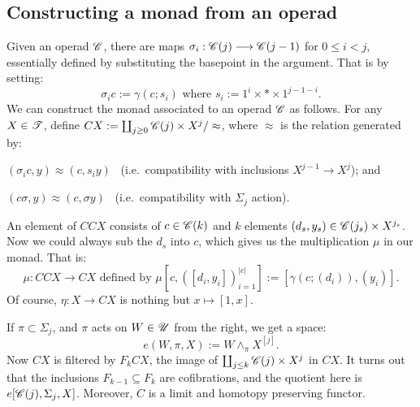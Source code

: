 \documentclass[11pt]{article}
\begin{document}
\subsection{Constructing a monad from an operad}
Given an operad $\mathscr{C}$, there are maps $\sigma_i:\mathscr{C}(j)\longrightarrow\mathscr{C}(j-1)$ for
$0\leq i<j$, essentially defined by substituting the basepoint in the \iTH
argument. That is by setting:
\[\sigma_ic:=\gamma(c;s_i)\text{ where }s_i:=1^i\times *\times1^{j-1-i}.\]
We can construct the monad associated to an operad $\mathscr{C}$ as follows. For any
$X\in\mathscr{T}$, define $CX:=\coprod_{j\geq0}\mathscr{C}(j)\times X^j/\approx$, where
$\approx$ is the relation generated by:
\begin{itemise}
\item $(\sigma_ic,y)\approx (c,s_iy)$ \ (i.e.\ 
compatibility with inclusions $X^{j-1}\to X^j$); and
\item $(c\sigma,y)\approx (c,\sigma y)$ \ (i.e.\ 
compatibility with $\Sigma_j$ action).
\end{itemise}
An element of $CCX$ consists of $c\in \mathscr{C}(k)$ and $k$ elements 
$(d_s,y_s)\in \mathscr{C}(j_s)\times X^{j_s}$. Now we could always sub the $d_s$
into $c$, which gives us the multiplication $\mu$ in our monad. That is:
\[\mu:CCX\to CX\text{ defined by }
\mu[c,([d_i,y_i])_{i=1}^{|c|}]:=[\gamma(c;(d_i)),(y_i)].\]
Of course, $\eta:X\to CX$ is nothing but $x\mapsto [1,x]$.

If $\pi\subset\Sigma_j$, 
and $\pi$ acts on $W\in\mathscr{U}$ from the right, we get a space:
\[e(W,\pi,X):=W\wedge_\pi X^{[j]}.\]
Now $CX$ is filtered by $F_kCX$, the image of
$\coprod_{j\leq k}\mathscr{C}(j)\times X^j$ in $CX$. It turns out that the inclusions
$F_{k-1}\subseteq F_{k}$ are cofibrations, and the quotient here is 
$e[\mathscr{C}(j),\Sigma_j,X]$. Moreover, $C$ is a limit and homotopy preserving
functor.
\end{document}
